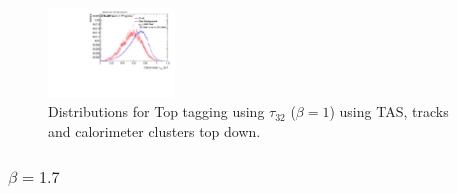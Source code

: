 \begin{figure}[H]
\includegraphics[width=0.3\textwidth]{sascha_input/Appendix/Distributions/top/distributions/beta1/h_recoJet_nSub32_bin6.pdf}
\vspace{-0.75cm}
\caption{\footnotesize{Distributions for Top tagging using $\tau_{32}$ ($\beta=1$) using TAS, tracks and calorimeter clusters top down.}}
\end{figure}

\subsubsection*{$\beta=1.7$}
